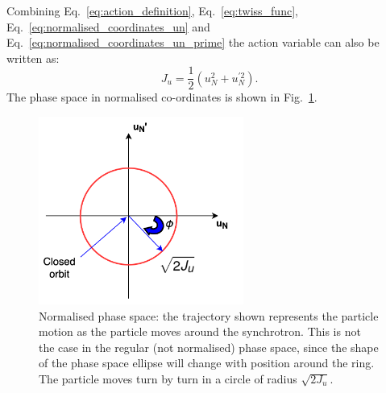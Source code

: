 Combining Eq.~\eqref{eq:action_definition}, Eq.~\eqref{eq:twiss_func}, Eq.~\eqref{eq:normalised_coordinates_un} and Eq.~\eqref{eq:normalised_coordinates_un_prime} the action variable can also be written as:
\begin{equation}\label{eq:action_normalised_coordinates}
    J_u = \frac{1}{2} (u_N^2+u_N^{\prime 2}).
\end{equation}
The phase space in normalised co-ordinates is shown in Fig.~\ref{fig:phase_space_circle_normalised}.
\begin{figure}[!h] %
    \centering         
    \includegraphics[width=0.6\textwidth]{images/Ch2/phase_space_normalised.png}
        \caption{Normalised phase space: the trajectory shown represents the particle motion as the particle moves around the synchrotron. This is not the case in the regular (not normalised) phase space, since the shape of the phase space ellipse will change with position around the ring. The particle moves turn by turn in a circle of radius $\sqrt{2J_u}$.}
        \label{fig:phase_space_circle_normalised}
 \end{figure}




